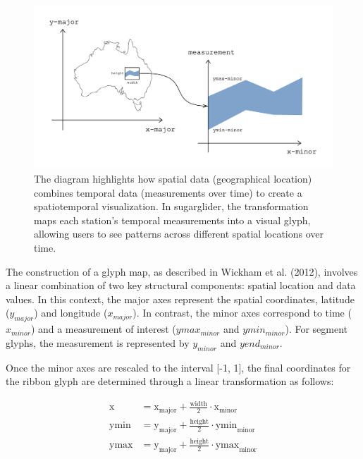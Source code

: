 \begin{figure}

{\centering \includegraphics[width=0.9\linewidth]{figures/diagram-transformation} 

}

\caption{The diagram highlights how spatial data (geographical location) combines temporal data (measurements over time) to create a spatiotemporal visualization. In sugarglider, the transformation maps each station's temporal measurements into a visual glyph, allowing users to see patterns across different spatial locations over time.}\label{fig:unnamed-chunk-7}
\end{figure}

The construction of a glyph map, as described in Wickham et al. (2012), involves a linear combination of two key structural components: spatial location and data values. In this context, the major axes represent the spatial coordinates, latitude (\(y_{major}\)) and longitude (\(x_{major}\)). In contrast, the minor axes correspond to time (\(x_{minor}\)) and a measurement of interest (\(ymax_{minor}\) and \(ymin_{minor}\)). For segment glyphs, the measurement is represented by \(y_{minor}\) and \(yend_{minor}\).

Once the minor axes are rescaled to the interval {[}-1, 1{]}, the final coordinates for the ribbon glyph are determined through a linear transformation as follows:

\begin{align}
\text{x} &= \text{x}_{\text{major}} + \frac{\text{width}}{2} \cdot \text{x}_{\text{minor}} \\
\text{ymin} &= \text{y}_{\text{major}} + \frac{\text{height}}{2} \cdot \text{ymin}_{\text{minor}} \\
\text{ymax} &= \text{y}_{\text{major}} + \frac{\text{height}}{2} \cdot \text{ymax}_{\text{minor}}
\end{align}

